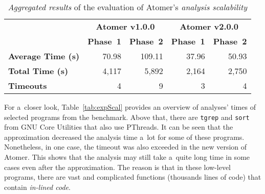 \begin{table}[hbt]
    \centering

    \begin{tabular}{|l|r|r|r|r|}
        \hline

        \multirow{2}{*}{} & \multicolumn{2}{c|}{\textbf{Atomer v1.0.0}} & \multicolumn{2}{c|}{\textbf{Atomer v2.0.0}} \\ \cline{2-5}

        & \textbf{Phase~1} & \textbf{Phase~2} & \textbf{Phase~1} & \textbf{Phase~2} \\ \hline \hline

        \textbf{Average Time (s)} & 70.98 & 109.11 & 37.96 & 50.93 \\ \hline

        \textbf{Total Time (s)} & 4,117 & 5,892 & 2,164 & 2,750 \\ \hline

        \textbf{Timeouts} & 4 & 9 & 3 & 4 \\ \hline
    \end{tabular}

    \caption{\emph{Aggregated results} of the evaluation of Atomer's \emph{analysis scalability}}
    \label{tab:expScalAgg}
\end{table}

For a~closer look, Table~\ref{tab:expScal} provides an overview of analyses' times of selected programs from the benchmark. Above that, there are \texttt{tgrep} and \texttt{sort} from GNU Core Utilities that also use PThreads. It can be seen that the approximation decreased the analysis time a~lot for some of these programs. Nonetheless, in one case, the timeout was also exceeded in the new version of Atomer. This shows that the analysis may still take a~quite long time in some cases even after the approximation. The reason is that in these low-level programs, there are vast and complicated functions (thousands lines of code) that contain \emph{in-lined code}.

